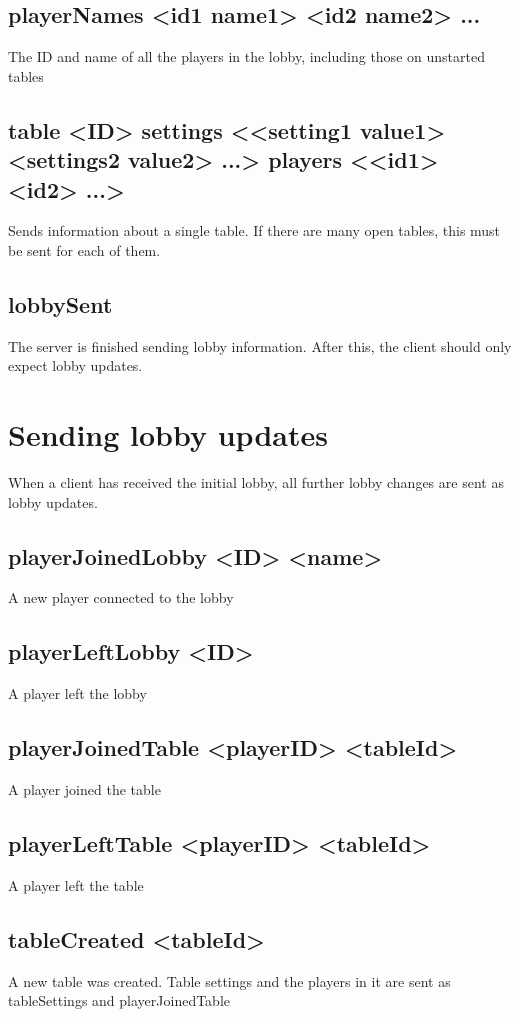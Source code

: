 \documentclass{article}
\begin{document}
\subsection*{playerNames <id1 name1> <id2 name2> ...}
The ID and name of all the players in the lobby, including those on unstarted tables

\subsection*{table <ID> settings <{}<setting1 value1> <settings2 value2> ...> players <{}<id1> <id2> ...>}
Sends information about a single table. If there are many open tables, this must be sent for each of them.

\subsection*{lobbySent}
The server is finished sending lobby information. After this, the client should only expect lobby updates.


\section{Sending lobby updates}
When a client has received the initial lobby, all further lobby changes are sent as lobby updates.

\subsection*{playerJoinedLobby <ID> <name>}
A new player connected to the lobby

\subsection*{playerLeftLobby <ID>}
A player left the lobby

\subsection*{playerJoinedTable <playerID> <tableId>}
A player joined the table

\subsection*{playerLeftTable <playerID> <tableId>}
A player left the table

\subsection*{tableCreated <tableId>}
A new table was created. Table settings and the players in it are sent as tableSettings and playerJoinedTable
\end{document}
